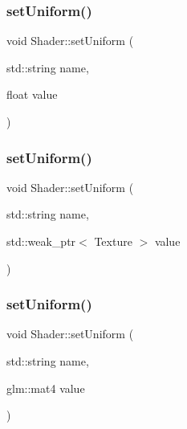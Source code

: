 \mbox{\label{class_shader_a6826cb5394def93884540565ffa4df7d}} 
\subsubsection{\texorpdfstring{set\+Uniform()}{setUniform()}\hspace{0.1cm}{\footnotesize\ttfamily [1/4]}}
{\footnotesize\ttfamily void Shader\+::set\+Uniform (\begin{DoxyParamCaption}\item[{std\+::string}]{name,  }\item[{float}]{value }\end{DoxyParamCaption})}

\mbox{\label{class_shader_a94dca1a3185ca11e8e0ca7f77c3ecb34}} 
\subsubsection{\texorpdfstring{set\+Uniform()}{setUniform()}\hspace{0.1cm}{\footnotesize\ttfamily [2/4]}}
{\footnotesize\ttfamily void Shader\+::set\+Uniform (\begin{DoxyParamCaption}\item[{std\+::string}]{name,  }\item[{std\+::weak\+\_\+ptr$<$ Texture $>$}]{value }\end{DoxyParamCaption})}

\mbox{\label{class_shader_a3f94c37778540d4d0d7ff107936e3750}} 
\subsubsection{\texorpdfstring{set\+Uniform()}{setUniform()}\hspace{0.1cm}{\footnotesize\ttfamily [3/4]}}
{\footnotesize\ttfamily void Shader\+::set\+Uniform (\begin{DoxyParamCaption}\item[{std\+::string}]{name,  }\item[{glm\+::mat4}]{value }\end{DoxyParamCaption})}

